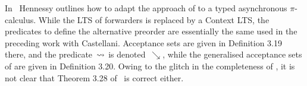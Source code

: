 In~\cite{DBLP:journals/jlp/Hennessy05} Hennessy outlines how to adapt the
approach of \cite{DBLP:conf/fsttcs/CastellaniH98} to a typed
asynchronous $\pi$-calculus. While the LTS of forwarders is
replaced by a Context LTS, the predicates to define the alternative
preorder are essentially the same used in the preceding work with
Castellani. Acceptance sets are given in Definition 3.19 there, and
the predicate~$\stackrel{}{\rightsquigarrow}$ is denoted~$\searrow$, while the generalised
acceptance sets of \cite{DBLP:conf/fsttcs/CastellaniH98} are given in
Definition 3.20.  Owing to the glitch in the completeness of
\cite{DBLP:conf/fsttcs/CastellaniH98}, it is not clear that Theorem
3.28 of~\cite{DBLP:journals/jlp/Hennessy05} is correct either.


